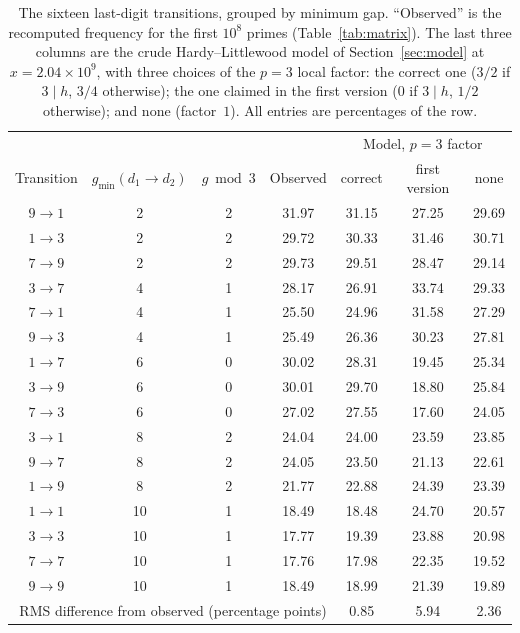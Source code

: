 \documentclass[12pt,a4paper]{article}
\theoremstyle{plain}
\theoremstyle{definition}
\theoremstyle{remark}
\newcommand{\mgap}[2]{g_{\min}(#1 \to #2)}
\begin{document}
\begin{table}[htbp]
\centering
\caption{The sixteen last-digit transitions, grouped by minimum gap. ``Observed'' is the
recomputed frequency for the first $10^8$ primes (Table~\ref{tab:matrix}). The last three
columns are the crude Hardy--Littlewood model of Section~\ref{sec:model} at
$x = 2.04 \times 10^9$, with three choices of the $p = 3$ local factor: the correct one
($3/2$ if $3 \mid h$, $3/4$ otherwise); the one claimed in the first version ($0$ if
$3 \mid h$, $1/2$ otherwise); and none (factor~$1$). All entries are percentages of the
row.}
\label{tab:mingaps}
\renewcommand{\arraystretch}{1.15}
\small
\begin{tabular}{cccc|ccc}
\toprule
 & & & & \multicolumn{3}{c}{Model, $p=3$ factor} \\
Transition & $\mgap{d_1}{d_2}$ & $g \bmod 3$ & Observed & correct & first version & none \\
\midrule
$9 \to 1$ & 2 & 2 & 31.97 & 31.15 & 27.25 & 29.69 \\
$1 \to 3$ & 2 & 2 & 29.72 & 30.33 & 31.46 & 30.71 \\
$7 \to 9$ & 2 & 2 & 29.73 & 29.51 & 28.47 & 29.14 \\
\midrule
$3 \to 7$ & 4 & 1 & 28.17 & 26.91 & 33.74 & 29.33 \\
$7 \to 1$ & 4 & 1 & 25.50 & 24.96 & 31.58 & 27.29 \\
$9 \to 3$ & 4 & 1 & 25.49 & 26.36 & 30.23 & 27.81 \\
\midrule
$1 \to 7$ & 6 & 0 & 30.02 & 28.31 & 19.45 & 25.34 \\
$3 \to 9$ & 6 & 0 & 30.01 & 29.70 & 18.80 & 25.84 \\
$7 \to 3$ & 6 & 0 & 27.02 & 27.55 & 17.60 & 24.05 \\
\midrule
$3 \to 1$ & 8 & 2 & 24.04 & 24.00 & 23.59 & 23.85 \\
$9 \to 7$ & 8 & 2 & 24.05 & 23.50 & 21.13 & 22.61 \\
$1 \to 9$ & 8 & 2 & 21.77 & 22.88 & 24.39 & 23.39 \\
\midrule
$1 \to 1$ & 10 & 1 & 18.49 & 18.48 & 24.70 & 20.57 \\
$3 \to 3$ & 10 & 1 & 17.77 & 19.39 & 23.88 & 20.98 \\
$7 \to 7$ & 10 & 1 & 17.76 & 17.98 & 22.35 & 19.52 \\
$9 \to 9$ & 10 & 1 & 18.49 & 18.99 & 21.39 & 19.89 \\
\midrule
\multicolumn{4}{r|}{RMS difference from observed (percentage points)} & 0.85 & 5.94 & 2.36 \\
\bottomrule
\end{tabular}
\end{table}
\end{document}
